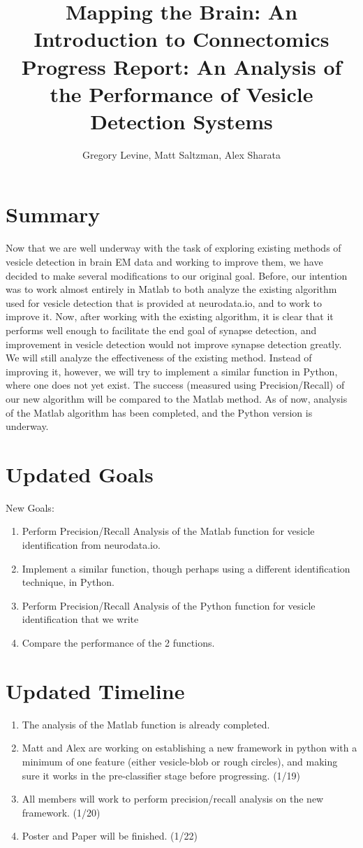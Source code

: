 \documentclass[11pt]{article} %
\title{Mapping the Brain: An Introduction to Connectomics\\Progress Report: An Analysis of the Performance of Vesicle Detection Systems}
\author{Gregory Levine, Matt Saltzman, Alex Sharata}
\begin{document}
\maketitle

\section{Summary}
Now that we are well underway with the task of exploring existing methods of vesicle detection in brain EM data and working to improve them, we have decided to make several modifications to our original goal. Before, our intention was to work almost entirely in Matlab to both analyze the existing algorithm used for vesicle detection that is provided at neurodata.io, and to work to improve it. Now, after working with the existing algorithm, it is clear that it performs well enough to facilitate the end goal of synapse detection, and improvement in vesicle detection would not improve synapse detection greatly.  We will still analyze the effectiveness of the existing method. Instead of improving it, however, we will try to implement a similar function in Python, where one does not yet exist. The success (measured using Precision/Recall) of our new algorithm will be compared to the Matlab method. As of now, analysis of the Matlab algorithm has been completed, and the Python version is underway.

\section{Updated Goals}
New Goals:
\begin{enumerate}
\item Perform Precision/Recall Analysis of the Matlab function for vesicle identification from neurodata.io.
\item Implement a similar function, though perhaps using a different identification technique, in Python.
\item Perform Precision/Recall Analysis of the Python function for vesicle identification that we write
\item Compare the performance of the 2 functions.
\end{enumerate}
\section{Updated Timeline}
\begin{enumerate}
\item The analysis of the Matlab function is already completed. 
\item Matt and Alex are working on establishing a new framework in python with a minimum of one feature (either vesicle-blob or rough circles), and making sure it works in the pre-classifier stage before progressing. (1/19)
\item All members will work to perform precision/recall analysis on the new framework. (1/20)
\item Poster and Paper will be finished. (1/22)
\end{enumerate}
\end{document}
